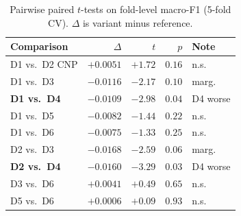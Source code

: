 \documentclass[runningheads]{llncs}
\begin{document}
\begin{table}[t]
  \caption{Pairwise paired $t$-tests on fold-level macro-F1 (5-fold
  CV). $\Delta$ is variant minus reference.}
  \label{tab:suppl-tests}
  \centering
  \begin{tabular}{@{}l rrr l@{}}
    \toprule
    Comparison & $\Delta$ & $t$ & $p$ & Note \\
    \midrule
    D1 vs.\ D2 CNP        & $+0.0051$ & $+1.72$ & $0.16$ & n.s. \\
    D1 vs.\ D3            & $-0.0116$ & $-2.17$ & $0.10$ & marg. \\
    \textbf{D1 vs.\ D4}   & $\bm{-0.0109}$ & $\bm{-2.98}$ & $\bm{0.04}$ & D4 worse \\
    D1 vs.\ D5            & $-0.0082$ & $-1.44$ & $0.22$ & n.s. \\
    D1 vs.\ D6            & $-0.0075$ & $-1.33$ & $0.25$ & n.s. \\
    D2 vs.\ D3            & $-0.0168$ & $-2.59$ & $0.06$ & marg. \\
    \textbf{D2 vs.\ D4}   & $\bm{-0.0160}$ & $\bm{-3.29}$ & $\bm{0.03}$ & D4 worse \\
    D3 vs.\ D6            & $+0.0041$ & $+0.49$ & $0.65$ & n.s. \\
    D5 vs.\ D6            & $+0.0006$ & $+0.09$ & $0.93$ & n.s. \\
    \bottomrule
  \end{tabular}
\end{table}
\end{document}
